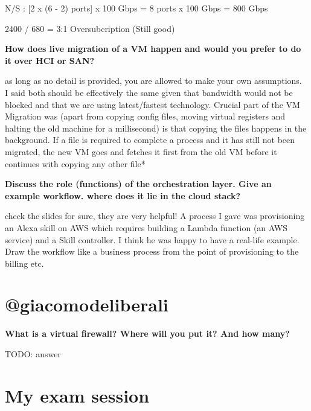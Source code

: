 N/S : {[}2 x (6 - 2) ports{]} x 100 Gbps = 8 ports x 100 Gbps = 800 Gbps

2400 / 680 = 3:1 Oversubcription (Still good)

\textbf{How does live migration of a VM happen and would you prefer to
do it over HCI or SAN?}

as long as no detail is provided, you are allowed to make your own
assumptions.\\
I said both should be effectively the same given that bandwidth would
not be blocked and that we are using latest/fastest technology. Crucial
part of the VM Migration was (apart from copying config files, moving
virtual registers and halting the old machine for a millisecond) is that
copying the files happens in the background. If a file is required to
complete a process and it has still not been migrated, the new VM goes
and fetches it first from the old VM before it continues with copying
any other file*\\

\textbf{Discuss the role (functions) of the orchestration layer. Give an
example workflow. where does it lie in the cloud stack?}

check the slides for sure, they are very helpful! A process I gave was
provisioning an Alexa skill on AWS which requires building a Lambda
function (an AWS service) and a Skill controller. I think he was happy
to have a real-life example. Draw the workflow like a business process
from the point of provisioning to the billing etc.

\hypertarget{giacomodeliberali}{%
\section{@giacomodeliberali}\label{giacomodeliberali}}

\textbf{What is a virtual firewall? Where will you put it? And how
many?}

TODO: answer


\section{My exam session}
